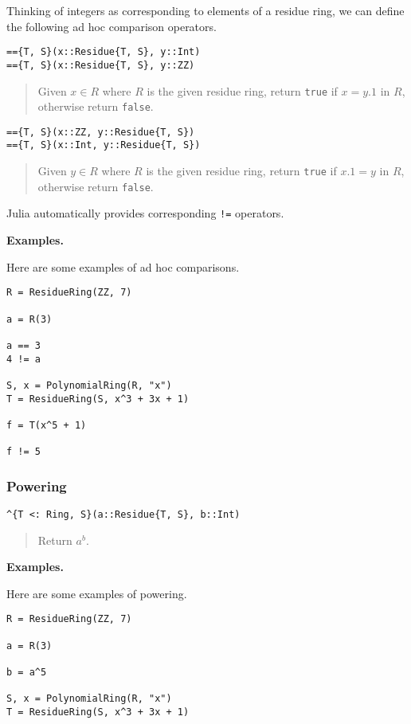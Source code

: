 \documentclass[a4paper,10pt]{article}
\newcommand{\code}{\lstinline}
\newcommand{\desc}[1]{\vspace{-3mm}\begin{quote}#1\end{quote}}
\begin{document}
{{Thinking of integers as corresponding to elements of a residue ring, we
can define the following ad hoc comparison operators.

\begin{lstlisting}
=={T, S}(x::Residue{T, S}, y::Int)
=={T, S}(x::Residue{T, S}, y::ZZ)
\end{lstlisting}

\desc{Given $x \in R$ where $R$ is the given residue ring, return \code{true} 
if $x = y.1$ in $R$, otherwise return \code{false}.}

\begin{lstlisting}
=={T, S}(x::ZZ, y::Residue{T, S})
=={T, S}(x::Int, y::Residue{T, S})
\end{lstlisting}

\desc{Given $y \in R$ where $R$ is the given residue ring, return \code{true} 
if $x.1 = y$ in $R$, otherwise return \code{false}.}

Julia automatically provides corresponding \code{!=} operators.

\textbf{Examples.}

Here are some examples of ad hoc comparisons.

\begin{lstlisting}
R = ResidueRing(ZZ, 7)

a = R(3)

a == 3
4 != a

S, x = PolynomialRing(R, "x")
T = ResidueRing(S, x^3 + 3x + 1)

f = T(x^5 + 1)

f != 5
\end{lstlisting}

\subsubsection{Powering}

\begin{lstlisting}
^{T <: Ring, S}(a::Residue{T, S}, b::Int)
\end{lstlisting}

\desc{Return $a^b$.}

\textbf{Examples.}

Here are some examples of powering.

\begin{lstlisting}
R = ResidueRing(ZZ, 7)

a = R(3)

b = a^5

S, x = PolynomialRing(R, "x")
T = ResidueRing(S, x^3 + 3x + 1)


\end{lstlisting}}}
\end{document}
